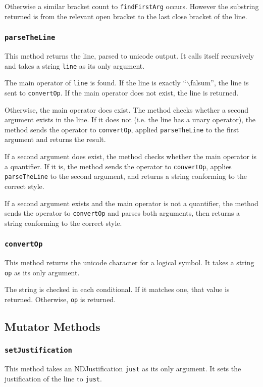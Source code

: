 \documentclass[a4paper]{article}
\begin{document}
Otherwise a similar bracket count to \texttt{findFirstArg} occurs. However the substring returned is from the relevant open bracket to the last close bracket of the line.

\subsubsection{\texttt{parseTheLine}}
This method returns the line, parsed to unicode output. It calls itself recursively and takes a string \texttt{line} as its only argument.

The main operator of \texttt{line} is found. If the line is exactly ``$\backslash$falsum'', the line is sent to \texttt{convertOp}. If the main operator does not exist, the line is returned.

Otherwise, the main operator does exist. The method checks whether a second argument exists in the line. If it does not (i.e. the line has a unary operator), the method sends the operator to \texttt{convertOp}, applied \texttt{parseTheLine} to the first argument and returns the result.

If a second argument does exist, the method checks whether the main operator is a quantifier. If it is, the method sends the operator to \texttt{convertOp}, applies \texttt{parseTheLine} to the second argument, and returns a string conforming to the correct style.

If a second argument exists and the main operator is not a quantifier, the method sends the operator to \texttt{convertOp} and parses both arguments, then returns a string conforming to the correct style.

\subsubsection{\texttt{convertOp}}
This method returns the unicode character for a logical symbol. It takes a string \texttt{op} as its only argument.

The string is checked in each conditional. If it matches one, that value is returned. Otherwise, \texttt{op} is returned.

\subsection{Mutator Methods}
 \subsubsection{\texttt{setJustification}}
This method takes an NDJustification \texttt{just} as its only argument. It sets the justification of the line to \texttt{just}.
\end{document}
